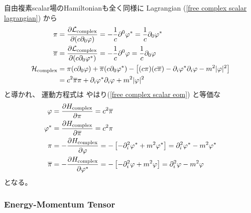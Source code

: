 自由複素scalar場のHamiltonianも全く同様に
Lagrangian
(\ref{free complex scalar lagrangian})
から
\begin{subequations}
\begin{align}
    \pi
&=
    \dfrac{\partial \mathcal{L}_{\rm complex}}
        {\partial (c \partial_0 \varphi)}
=
    - \dfrac{1}{c}
    \partial^0 \varphi^*
=
    \dfrac{1}{c}
    \partial_0 \varphi^*
\notag\\
    \overline{\pi}
&=
    \dfrac{\partial \mathcal{L}_{\rm complex}}
        {\partial (c \partial_0 \varphi^*)}
=
    - \dfrac{1}{c}
    \partial^0 \varphi
=
    \dfrac{1}{c}
    \partial_0 \varphi
\notag\\
    \mathcal{H}_{\rm complex}
&=
    \pi (c \partial_0 \varphi)
    +
    \overline{\pi} (c \partial_0 \varphi^*)
    -
    \left[
        (c \pi)
        (c \overline{\pi})
    -
        \partial_i \varphi^*
        \partial_i \varphi
    -
        m^2 |\varphi|^2
    \right]
\notag\\&
=
    c^2 \overline{\pi} \pi
    +
        \partial_i \varphi^*
        \partial_i \varphi
    +
        m^2 |\varphi|^2
\end{align}
\end{subequations}
と導かれ、
運動方程式は
やはり(\ref{free complex scalar eom})
と等価な
\begin{subequations}
\begin{align}
    \dot{\varphi}
&=
    \dfrac{
        \partial H_{\rm complex}
    }{ \partial \pi}
=
    c^2 \overline{\pi}
\\
    \dot{\varphi}^*
&=
    \dfrac{
        \partial H_{\rm complex}
    }{ \partial \overline{\pi}}
=
    c^2 \pi
\\
    \dot{\pi}
&=
    -
    \dfrac{
        \partial H_{\rm complex}
    }{ \partial \varphi}
=
    - \left[
    -
        \partial_i^2 \varphi^*
    +
        m^2 \varphi^*
    \right]
=
        \partial_i^2 \varphi^*
    -
        m^2 \varphi^*
\\
    \dot{\overline{\pi}}
&=
    -
    \dfrac{
        \partial H_{\rm complex}
    }{ \partial \varphi^*}
=
    - \left[
    -
        \partial_i^2 \varphi
    +
        m^2 \varphi
    \right]
=
        \partial_i^2 \varphi
    -
        m^2 \varphi
\end{align}
\end{subequations}
となる。

\subsubsection{Energy-Momentum Tensor}

